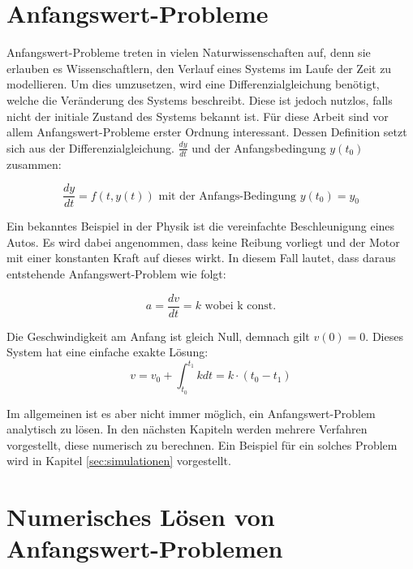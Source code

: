 
\section{Anfangswert-Probleme} \label{sec:anfangswert_probleme}

Anfangswert-Probleme treten in vielen Naturwissenschaften auf, denn sie erlauben es Wissenschaftlern, 
den Verlauf eines Systems im Laufe der Zeit zu modellieren.
Um dies umzusetzen, wird eine Differenzialgleichung benötigt, welche die Veränderung des Systems beschreibt.
Diese ist jedoch nutzlos, falls nicht der initiale Zustand des Systems bekannt ist.
Für diese Arbeit sind vor allem Anfangswert-Probleme erster Ordnung interessant.
Dessen Definition setzt sich aus der Differenzialgleichung. $\frac{dy}{dt}$ und der Anfangsbedingung $y(t_0)$ zusammen:

$$
\frac{dy}{dt} = f(t, y(t)) \text{ mit der Anfangs-Bedingung } y(t_0) = y_0
$$

Ein bekanntes Beispiel in der Physik ist die vereinfachte Beschleunigung eines Autos.
Es wird dabei angenommen, dass keine Reibung vorliegt und der Motor mit einer konstanten Kraft auf dieses wirkt.
In diesem Fall lautet, dass daraus entstehende Anfangswert-Problem wie folgt:

$$
a = \frac{dv}{dt} = k \text{ wobei k const.}
$$

Die Geschwindigkeit am Anfang ist gleich Null, demnach gilt  $v(0) = 0$.
Dieses System hat eine einfache exakte Lösung:
$$
v = v_0 + \int_{t_0}^{t_1} k dt = k \cdot (t_0 - t_1) 
$$

Im allgemeinen ist es aber nicht immer möglich, 
ein Anfangswert-Problem analytisch zu lösen. 
In den nächsten Kapiteln werden mehrere Verfahren vorgestellt, diese numerisch zu berechnen.
Ein Beispiel für ein solches Problem wird in Kapitel \ref{sec:simulationen} vorgestellt.

\section{Numerisches Lösen von Anfangswert-Problemen} \label{sec:numerisches_lösen_von_anfangswert_problemen}


